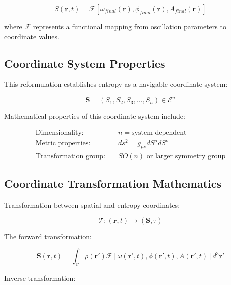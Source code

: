 \documentclass[12pt,a4paper]{article}
\begin{document}
\begin{equation}
S(\mathbf{r}, t) = \mathcal{F}[\omega_{final}(\mathbf{r}), \phi_{final}(\mathbf{r}), A_{final}(\mathbf{r})]
\label{eq:oscillatory_entropy}
\end{equation}

where $\mathcal{F}$ represents a functional mapping from oscillation parameters to coordinate values.

\subsection{Coordinate System Properties}

This reformulation establishes entropy as a navigable coordinate system:

\begin{equation}
\mathbf{S} = (S_1, S_2, S_3, \ldots, S_n) \in \mathcal{E}^n
\label{eq:entropy_coordinates}
\end{equation}

Mathematical properties of this coordinate system include:

\begin{align}
\text{Dimensionality:} &\quad n = \text{system-dependent} \\
\text{Metric properties:} &\quad ds^2 = g_{\mu\nu} dS^\mu dS^\nu \\
\text{Transformation group:} &\quad SO(n) \text{ or larger symmetry group}
\end{align}

\subsection{Coordinate Transformation Mathematics}

Transformation between spatial and entropy coordinates:

\begin{equation}
\mathcal{T}: (\mathbf{r}, t) \rightarrow (\mathbf{S}, \tau)
\label{eq:coordinate_transform}
\end{equation}

The forward transformation:

\begin{equation}
\mathbf{S}(\mathbf{r}, t) = \int_{\mathcal{V}} \rho(\mathbf{r}') \mathcal{F}[\omega(\mathbf{r}', t), \phi(\mathbf{r}', t), A(\mathbf{r}', t)] d^3\mathbf{r}'
\label{eq:forward_transform}
\end{equation}

Inverse transformation:
\end{document}
